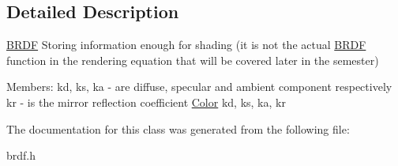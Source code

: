 \subsection{Detailed Description}
\mbox{\hyperlink{class_b_r_d_f}{B\+R\+DF}} Storing information enough for shading (it is not the actual \mbox{\hyperlink{class_b_r_d_f}{B\+R\+DF}} function in the rendering equation that will be covered later in the semester)

Members\+: kd, ks, ka -\/ are diffuse, specular and ambient component respectively kr -\/ is the mirror reflection coefficient \mbox{\hyperlink{class_color}{Color}} kd, ks, ka, kr 

The documentation for this class was generated from the following file\+:\begin{DoxyCompactItemize}
\item 
brdf.\+h\end{DoxyCompactItemize}
